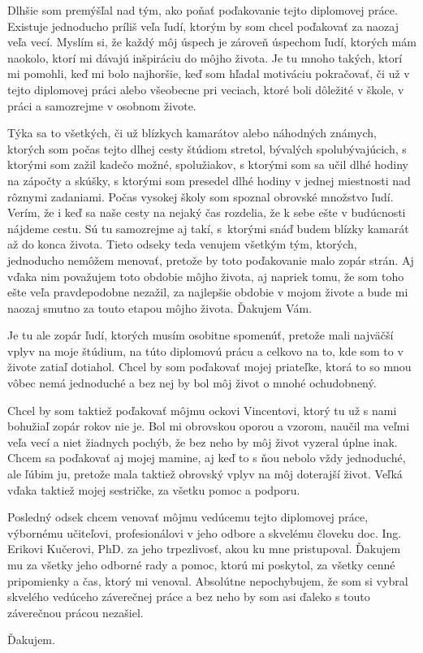 Dlhšie som premýšľal nad tým, ako poňať poďakovanie tejto diplomovej práce. Existuje jednoducho príliš veľa ľudí, ktorým by som chcel poďakovať za naozaj veľa vecí. Myslím si, že každý môj úspech je zároveň úspechom ľudí, ktorých mám naokolo, ktorí mi dávajú inšpiráciu do môjho života. Je tu mnoho takých, ktorí mi pomohli, keď mi bolo najhoršie, keď som hľadal motiváciu pokračovať, či už v tejto diplomovej práci alebo všeobecne pri veciach, ktoré boli dôležité v škole, v práci a samozrejme v osobnom živote. 

Týka sa to všetkých, či už blízkych kamarátov alebo náhodných známych, ktorých som počas tejto dlhej cesty štúdiom stretol, bývalých spolubývajúcich, s ktorými som zažil kadečo možné, spolužiakov, s ktorými som sa učil dlhé hodiny na zápočty a skúšky, s ktorými som presedel dlhé hodiny v jednej miestnosti nad rôznymi zadaniami. Počas vysokej školy som spoznal obrovské množstvo ľudí. Verím, že i keď sa naše cesty na nejaký čas rozdelia, že k sebe ešte v budúcnosti nájdeme cestu. Sú tu samozrejme aj takí, s~ktorými snáď budem blízky kamarát až do konca života. Tieto odseky teda venujem všetkým tým, ktorých, jednoducho nemôžem menovať, pretože by toto poďakovanie malo zopár strán. Aj vďaka nim považujem toto obdobie môjho života, aj napriek tomu, že som toho ešte veľa pravdepodobne nezažil, za najlepšie obdobie v mojom živote a bude mi naozaj smutno za touto etapou môjho života. Ďakujem Vám. 

Je tu ale zopár ľudí, ktorých musím osobitne spomenúť, pretože mali najväčší vplyv na moje štúdium, na túto diplomovú prácu a celkovo na to, kde som to v živote zatiaľ dotiahol. Chcel by som poďakovať mojej priateľke, ktorá to so mnou vôbec nemá jednoduché a bez nej by bol môj život o mnohé ochudobnený. 

Chcel by som taktiež poďakovať môjmu ockovi Vincentovi, ktorý tu už s nami bohužiaľ zopár rokov nie je. Bol mi obrovskou oporou a vzorom, naučil ma veľmi veľa vecí a niet žiadnych pochýb, že bez neho by môj život vyzeral úplne inak. Chcem sa poďakovať aj mojej mamine, aj keď to s ňou nebolo vždy jednoduché, ale ľúbim ju, pretože mala taktiež obrovský vplyv na môj doterajší život. Veľká vďaka taktiež mojej sestričke, za všetku pomoc a podporu. 

Posledný odsek chcem venovať môjmu vedúcemu tejto diplomovej práce, výbornému učiteľovi, profesionálovi v jeho odbore a skvelému človeku doc. Ing. Erikovi Kučerovi, PhD. za jeho trpezlivosť, akou ku mne pristupoval. Ďakujem mu za všetky jeho odborné rady a pomoc, ktorú mi poskytol, za všetky cenné pripomienky a čas, ktorý mi venoval. Absolútne nepochybujem, že som si vybral skvelého vedúceho záverečnej práce a bez neho by som asi ďaleko s touto záverečnou prácou nezašiel.

Ďakujem.